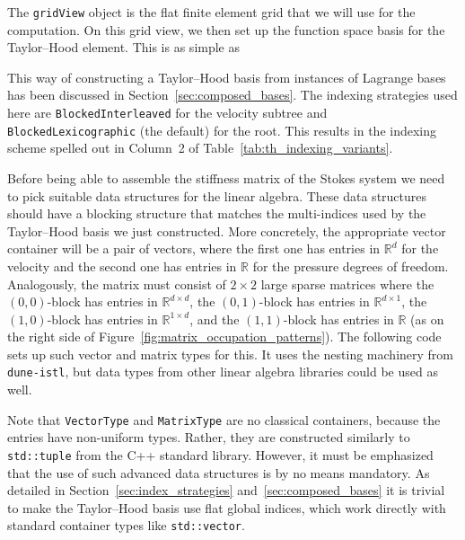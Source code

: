 \documentclass[a4paper,10pt,headings=normal,bibliography=totoc]{scrartcl}
\newcommand{\cpp}[1]{\lstinline[basicstyle=\ttfamily]!#1!}
\newcommand{\R}{\mathbb{R}}
\newcommand{\dunemodule}[1]{\texttt{#1}}
\begin{document}
%

%
%

%
The \cpp{gridView} object is the flat finite element grid that we will use for
the computation.
On this grid view, we then set up the function space basis for the Taylor--Hood element.  This is as simple as
%

%
This way of constructing a Taylor--Hood basis from instances of Lagrange bases
has been discussed in Section~\ref{sec:composed_bases}.  The indexing strategies
used here are \cpp{BlockedInterleaved} for the velocity subtree and \cpp{BlockedLexicographic}
(the default) for the root.  This results in the indexing scheme spelled out in
Column~2 of Table~\ref{tab:th_indexing_variants}.

Before being able to assemble the stiffness matrix of the Stokes system we need to pick suitable data structures
for the linear algebra.
These data structures should have a blocking structure that matches the multi-indices
used by the Taylor--Hood basis we just constructed.  More concretely,
the appropriate vector container will be a pair of vectors, where the first one
has entries in $\mathbb{R}^d$ for the velocity and the second one has entries in $\mathbb{R}$
for the pressure degrees of freedom.  Analogously, the matrix must consist of
$2 \times 2$ large sparse matrices where
the $(0,0)$-block has entries in $\R^{d\times d}$,
the $(0,1)$-block has entries in $\R^{d\times 1}$,
the $(1,0)$-block has entries in $\R^{1\times d}$,
and the $(1,1)$-block has entries in $\R$
(as on the right side of Figure~\ref{fig:matrix_occupation_patterns}).
The following code sets up such vector and matrix types for this.
It uses the nesting machinery from \dunemodule{dune-istl},
but data types from other linear algebra libraries could be used as well.
%

%
Note that \cpp{VectorType} and \cpp{MatrixType}
are no classical containers, because the entries have non-uniform types.
Rather, they are constructed similarly to \cpp{std::tuple} from the C++ standard library.
However, it must be emphasized that the use of such advanced data structures is by no
means mandatory. As detailed in Section~\ref{sec:index_strategies}
and~\ref{sec:composed_bases} it is trivial to make the Taylor--Hood basis
use flat global indices, which work directly with standard container types like \cpp{std::vector}.
\end{document}
